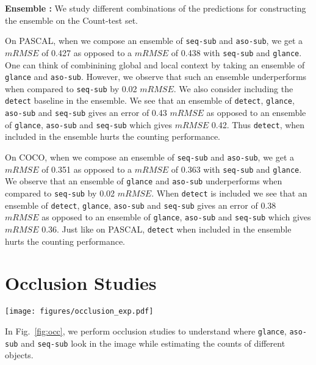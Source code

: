 \documentclass[10pt,twocolumn,letterpaper]{article}
\newcommand{\detect}{\texttt{detect}\xspace}
\newcommand{\sub}{\texttt{aso-sub}\xspace}
\newcommand{\seq}{\texttt{seq-sub}\xspace}
\newcommand{\glance}{\texttt{glance}\xspace}
\newcommand{\reffig}[1]{Fig.~\ref{#1}}
\begin{document}
\textbf{Ensemble : }
We study different combinations of the predictions for constructing the ensemble on the Count-test set.

On PASCAL, when we compose an ensemble of \seq and \sub, we get a $mRMSE$ of 0.427 as opposed to a $mRMSE$ of 0.438 with \seq and \glance. One can think of combinining global and local context by taking an ensemble of \glance and \sub. However, we observe that such an ensemble underperforms when compared to \seq by 0.02 $mRMSE$. We also consider including the \detect baseline in the ensemble. We see that an ensemble of \detect, \glance, \sub and \seq gives an error of 0.43 $mRMSE$ as opposed to an ensemble of \glance, \sub and \seq which gives $mRMSE$ 0.42. Thus \detect, when included in the ensemble hurts the counting performance.

On COCO, when we compose an ensemble of \seq and \sub, we get a $mRMSE$ of 0.351 as opposed to a $mRMSE$ of 0.363 with \seq and \glance. We observe that an ensemble of \glance and \sub underperforms when compared to \seq by 0.02 $mRMSE$. When \detect is included we see that an ensemble of \detect, \glance, \sub and \seq gives an error of 0.38 $mRMSE$ as opposed to an ensemble of \glance, \sub and \seq which gives $mRMSE$ 0.36. Just like on PASCAL, \detect when included in the ensemble hurts the counting performance. 
\section{Occlusion Studies}\label{sec:occ}
\begin{figure*}
\texttt{[image: figures/occlusion\_exp.pdf]}
\caption{Occlusion maps obtained on COCO Count-test images for \glance, \seq and \sub by moving a mask of size $4\times4$ over the images before doing a forward pass through each of the models. Notice how \glance{} and \seq{} approaches tend to look at similar regions for lower counts, while for higher counts \seq{} and \sub{} tend to be more similar.}
\label{fig:occ}
\vspace{-10pt}
\end{figure*}

In \reffig{fig:occ}, we perform occlusion studies to understand where \glance, \sub and \seq look in the image while estimating the counts of different objects. 
\end{document}
